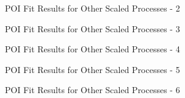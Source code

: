 \begin{frame}{POI Fit Results for Other Scaled Processes - 2}
\begin{scriptsize}
% 
\end{scriptsize}

\end{frame}

\begin{frame}{POI Fit Results for Other Scaled Processes - 3}
\vskip -0.3cm
\begin{scriptsize}
% 
\end{scriptsize}

\end{frame}


\begin{frame}{POI Fit Results for Other Scaled Processes - 4}
\vskip -0.3cm
\begin{scriptsize}
% 
\end{scriptsize}
\vskip -0.1cm

\end{frame}

\begin{frame}{POI Fit Results for Other Scaled Processes - 5}
\vskip -0.3cm
\begin{scriptsize}
% 
\end{scriptsize}
\vskip -0.1cm

\end{frame}

\begin{frame}{POI Fit Results for Other Scaled Processes - 6}
\vskip -0.3cm
\begin{scriptsize}
% 
\end{scriptsize}
\vskip -0.1cm

\end{frame}
